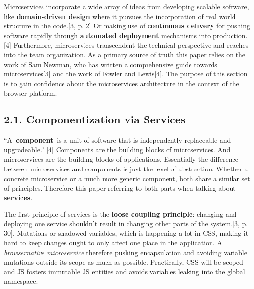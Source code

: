 \documentclass[]{article}
\begin{document}
Microservices incorporate a wide array of ideas from developing scalable
software, like \textbf{domain-driven design} where it pursues the
incorporation of real world structure in the code.{[}3, p. 2{]} Or
making use of \textbf{continuous delivery} for pushing software rapidly
through \textbf{automated deployment} mechanisms into production.{[}4{]}
Furthermore, microservices transcendent the technical perspective and
reaches into the team organization. As a primary source of truth this
paper relies on the work of Sam Newman, who has written a comprehensive
guide towards microservices{[}3{]} and the work of Fowler and
Lewis{[}4{]}. The purpose of this section is to gain confidence about
the microservices architecture in the context of the browser platform.

\subsection{2.1. Componentization via
Services}\label{componentization-via-services}

``A~\textbf{component}~is a unit of software that is independently
replaceable and upgradeable.'' {[}4{]} Components are the building
blocks of microservices. And microservices are the building blocks of
applications. Essentially the difference between microservices and
components is just the level of abstraction. Whether a concrete
microservice or a much more generic component, both share a similar set
of principles. Therefore this paper referring to both parts when talking
about \textbf{services}.

The first principle of services is the \textbf{loose coupling
principle}: changing and deploying one service shouldn't result in
changing other parts of the system.{[}3, p. 30{]}. Mutations or shadowed
variables, which is happening a lot in CSS, making it hard to keep
changes ought to only affect one place in the application. A
\emph{browsernative microservice} therefore pushing encapsulation and
avoiding variable mutations outside its scope as much as possible.
Practically, CSS will be scoped and JS fosters immutable JS entities and
avoids variables leaking into the global namespace.
\end{document}
